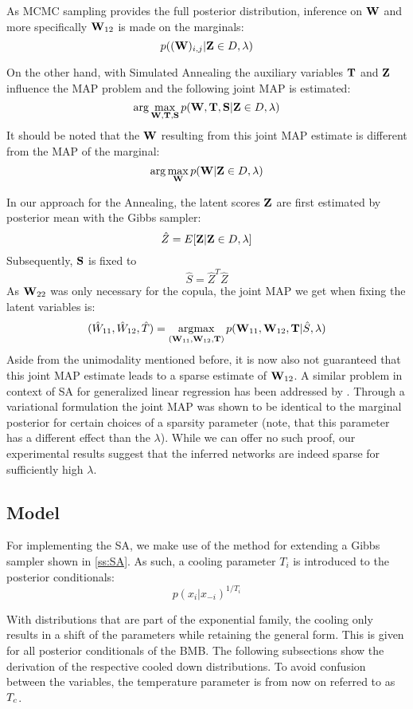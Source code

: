As \gls{MCMC} sampling provides the full posterior distribution,
inference on $\mathbf{W}$ and more specifically $\mathbf{W}_{12}$ is made on the marginals:
$$
p((\mathbf{W})_{i,j}|\mathbf{Z}\in D, \lambda)
$$

On the other hand, with Simulated Annealing the auxiliary variables $\mathbf{T}$ and $\mathbf{Z}$ influence the MAP problem and the following joint \gls{MAP} is estimated:
$$
\arg\max_{\mathbf{W}, \mathbf{T}, \mathbf{S}} p(\mathbf{W}, \mathbf{T}, \mathbf{S} | \mathbf{Z}\in D, \lambda)
$$
It should be noted that the $\mathbf{W}$ resulting from this joint \gls{MAP} estimate is different from the \gls{MAP} of the marginal:
$$
\arg\max_{\mathbf{W}} p(\mathbf{W}|\mathbf{Z}\in D, \lambda)
$$

In our approach for the Annealing, the latent scores $\mathbf{Z}$ are first estimated by posterior mean with the Gibbs sampler:
$$
\hat{Z} = E[\mathbf{Z}|\mathbf{Z}\in D, \lambda] 
$$
Subsequently, $\mathbf{S}$ is fixed to
$$
\hat{S} = \hat{Z}^T\hat{Z}
$$
As $\mathbf{W}_{22}$ was only necessary for the copula, the joint MAP we get when fixing the latent variables is:
$$
(\hat W_{11}, \hat W_{12}, \hat{T}) = \operatorname*{\arg\!\max}_{(\mathbf{W}_{11}, \mathbf{W}_{12}, \mathbf{T})} p(\mathbf{W}_{11}, \mathbf{W}_{12}, \mathbf{T} | \hat{S}, \lambda)
$$
Aside from the unimodality mentioned before, it is now also not guaranteed that this joint \gls{MAP} estimate leads to a sparse estimate of $\mathbf{W}_{12}$.
A similar problem in context of SA for generalized linear regression has been addressed by \citet{raman2012sparse}.
Through a variational formulation the joint MAP was shown to be identical to the marginal posterior for certain choices of a sparsity parameter (note, that this parameter has a different effect than the $\lambda$).
While we can offer no such proof, our experimental results suggest that the inferred networks are indeed sparse
for sufficiently high $\lambda$.

\subsection{Model}
For implementing the \gls{SA}, we make use of the method for extending a Gibbs sampler shown in \autoref{ss:SA}. 
As such, a cooling parameter $T_i$ is introduced to the posterior conditionals:
$$p(x_i|x_{-i})^{1/T_i}$$ 

With distributions that are part of the exponential family, the cooling only results in a shift of the parameters while retaining the general form. 
This is given for all posterior conditionals of the \gls{BMB}.
The following subsections show the derivation of the respective cooled down distributions.
To avoid confusion between the variables, the temperature parameter is from now on referred to as $T_{c}$.
